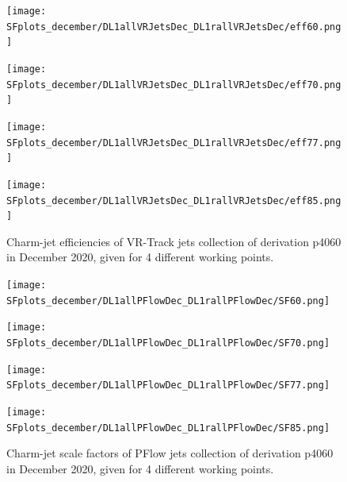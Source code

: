 \documentclass[letterpaper,12pt]{article}
\begin{document}
\begin{figure}[H]
\begin{minipage}[b]{.45\textwidth}
\centering
\texttt{[image: SFplots\_december/DL1allVRJetsDec\_DL1rallVRJetsDec/eff60.png]}
\end{minipage}\hfill
\begin{minipage}[b]{.45\textwidth}
\centering
\texttt{[image: SFplots\_december/DL1allVRJetsDec\_DL1rallVRJetsDec/eff70.png]}
\end{minipage}\hfill
\begin{minipage}[b]{.45\textwidth}
\centering
\texttt{[image: SFplots\_december/DL1allVRJetsDec\_DL1rallVRJetsDec/eff77.png]}
\end{minipage}\hfill
\begin{minipage}[b]{.45\textwidth}
\centering
\texttt{[image: SFplots\_december/DL1allVRJetsDec\_DL1rallVRJetsDec/eff85.png]}
\end{minipage}
\caption{Charm-jet efficiencies of VR-Track jets collection of derivation p4060 in December 2020, given for 4 different working points.} \label{fig:Dec_eff_VRJets}
\end{figure}


\begin{figure}[H]
\begin{minipage}[b]{.45\textwidth}
\centering
\texttt{[image: SFplots\_december/DL1allPFlowDec\_DL1rallPFlowDec/SF60.png]}
\end{minipage}\hfill
\begin{minipage}[b]{.45\textwidth}
\centering
\texttt{[image: SFplots\_december/DL1allPFlowDec\_DL1rallPFlowDec/SF70.png]}
\end{minipage}\hfill
\begin{minipage}[b]{.45\textwidth}
\centering
\texttt{[image: SFplots\_december/DL1allPFlowDec\_DL1rallPFlowDec/SF77.png]}
\end{minipage}\hfill
\begin{minipage}[b]{.45\textwidth}
\centering
\texttt{[image: SFplots\_december/DL1allPFlowDec\_DL1rallPFlowDec/SF85.png]}
\end{minipage}
\caption{Charm-jet scale factors of PFlow jets collection of derivation p4060 in December 2020, given for 4 different working points.} \label{fig:Dec_SF_PFlow}
\end{figure}
\end{document}
